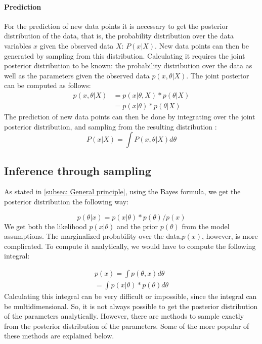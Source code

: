 \documentclass{article}
\begin{document}
\paragraph{Prediction}
For the prediction of new data points it is necessary to get the posterior distribution of the data, that is, the probability distribution over the data variables $x$ given the observed data $X$: $P(x|X)$. New data points can then be generated by sampling from this distribution. Calculating it requires the joint posterior distribution to be known: the probability distribution over the data as well as the parameters given the observed data $p(x,\theta|X)$. The joint posterior can be computed as follows:
\begin{equation}
\begin{aligned}
p(x,\theta|X) &	= p(x|\theta,X) * p(\theta|X) \\
 			& = p(x|\theta) * p(\theta|X)
\end{aligned}
\end{equation}
The prediction of new data points can then be done by integrating over the joint posterior distribution, and sampling from the resulting distribution \cite{1439840954}:
\begin{equation}
P(x|X) = \int P(x,\theta|X) d\theta
\end{equation}

\subsection{Inference through sampling}

As stated in \ref{subsec: General principle}, using the Bayes formula, we get the posterior distribution the following way:

\begin{equation}
p(\theta|x) = p(x|\theta) * p(\theta) / p(x)
\end{equation}
We get both the likelihood $p(x|\theta)$ and the prior $p(\theta)$ from the model assumptions. The marginalized probability over the data,$p(x)$, however, is more complicated. To compute it analytically, we would have to compute the following integral:

\begin{equation}
\begin{split}
p(x) = \int p(\theta,x) d \theta \\
=  \int p(x|\theta) * p(\theta) d \theta
\end{split}
\end{equation}
Calculating this integral can be very difficult or impossible, since the integral can be multidimensional. So, it is not always possible to get the posterior distribution of the parameters analytically. However, there are methods to sample exactly from the posterior distribution of the parameters. Some of the more popular of these methods are explained below.
\end{document}
